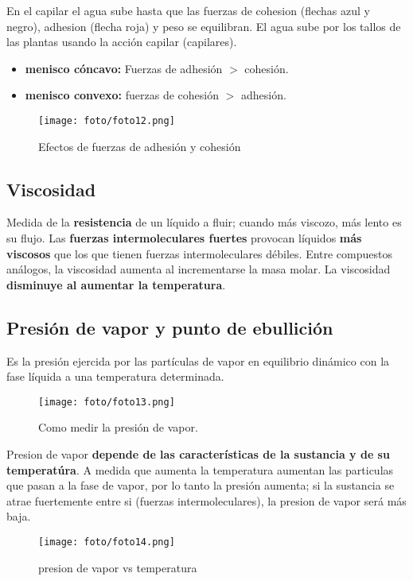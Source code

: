\documentclass[]{article}
\begin{document}
En el capilar el agua sube hasta que las fuerzas de cohesion (flechas azul y negro), adhesion (flecha roja) y peso se equilibran. El agua sube por los tallos de las plantas usando la acción capilar (capilares). 

\begin{itemize}
	\item \textbf{menisco cóncavo:} Fuerzas de adhesión $>$ cohesión.
	\item \textbf{menisco convexo:} fuerzas de cohesión $>$ adhesión.
\end{itemize}

\begin{figure}[H]
\center
\texttt{[image: foto/foto12.png]}
\caption{Efectos de fuerzas de adhesión y cohesión}
\end{figure}



\subsection{Viscosidad}
Medida de la \textbf{resistencia} de un líquido a fluir; cuando más viscozo, más lento es su flujo. Las \textbf{fuerzas intermoleculares fuertes} provocan líquidos \textbf{más viscosos} que los que tienen fuerzas intermoleculares débiles. Entre compuestos análogos, la viscosidad aumenta al incrementarse la masa molar. La viscosidad \textbf{disminuye al aumentar la temperatura}.



\subsection{Presión de vapor y punto de ebullición}
Es la presión ejercida por las partículas de vapor en equilibrio dinámico con la fase líquida a una temperatura determinada.

\begin{figure}[H]
\center
\texttt{[image: foto/foto13.png]}
\caption{Como medir la presión de vapor.}
\end{figure}

Presion de vapor \textbf{depende de las características de la sustancia y de su temperatúra}. A medida que aumenta la temperatura aumentan las particulas que pasan a la fase de vapor, por lo tanto la presión aumenta; si la sustancia se atrae fuertemente entre si (fuerzas intermoleculares), la presion de vapor será más baja.

\begin{figure}[H]
\center
\texttt{[image: foto/foto14.png]}
\caption{presion de vapor vs temperatura}
\end{figure}
\end{document}
